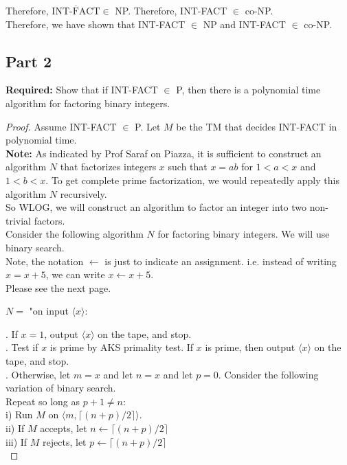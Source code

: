 \documentclass[12pt]{article}
\begin{document}
Therefore, $\overline{\text{INT-FACT}} \in $ NP. Therefore, INT-FACT $\in$ co-NP. \\
 
Therefore, we have shown that INT-FACT $\in$ NP and INT-FACT $\in$ co-NP. 

\subsection*{Part 2}

\textbf{Required:} Show that if INT-FACT $\in$ P, then there is a polynomial time algorithm for factoring binary integers. \\

\begin{proof}
Assume INT-FACT $\in$ P. Let $M$ be the TM that decides INT-FACT in polynomial time. \\

\textbf{Note:} As indicated by Prof Saraf on Piazza, it is sufficient to construct an algorithm $N$ that factorizes integers $x$ such that $x = ab$ for $1 < a < x$ and $1 < b < x$. To get complete prime factorization, we would repeatedly apply this algorithm $N$ recursively. \\

So WLOG, we will construct an algorithm to factor an integer into two non-trivial factors. \\ 

Consider the following algorithm $N$ for factoring binary integers. We will use binary search. \\

Note, the notation $\leftarrow$ is just to indicate an assignment. i.e. instead of writing $x = x + 5$, we can write $x \leftarrow x + 5$. \\

Please see the next page. 

\newpage

$N = $ "on input $\langle x \rangle$: \\

\setlength\parindent{15pt}

. If $x = 1$, output $\langle x \rangle$ on the tape, and stop. \\ 

. Test if $x$ is prime by AKS primality test. If $x$ is prime, then output $\langle x \rangle$ on the tape, \indent and stop. \\

. Otherwise, let $m = x$ and let $n = x$ and let $p = 0$. Consider the following variation of binary search. \\
\indent \indent \indent Repeat so long as $p+1 \neq n$: \\
\indent \indent \indent \indent i) Run $M$ on $\langle m, \lceil (n+p)/2 \rceil \rangle$. \\
\indent \indent \indent \indent ii) If $M$ accepts, let $n \leftarrow \lceil (n+p)/2 \rceil$ \\
\indent \indent \indent \indent iii) If $M$ rejects, let $p \leftarrow \lceil (n+p)/2 \rceil$ \\


\end{proof}
\end{document}
